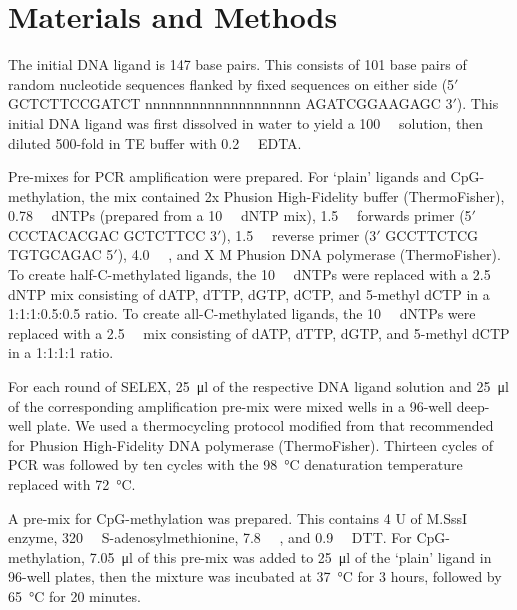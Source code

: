 \documentclass[parskip=full, numbers=noenddot]{scrreprt}
\begin{document}

\section{Materials and Methods}
\label{sec:emsaselex_methods}

The initial DNA ligand is 147 base pairs. This consists of 101 base pairs of random nucleotide sequences flanked by fixed sequences on either side (5$'$ GCTCTTCCGATCT nnnnnnnnnnnnnnnnnnnn AGATCGGAAGAGC 3$'$). This initial DNA ligand was first dissolved in water to yield a \SI{100}{\micro\Molar} solution, then diluted 500-fold in TE buffer with \SI{0.2}{\milli\Molar} EDTA.

Pre-mixes for PCR amplification were prepared. For `plain' ligands and CpG-methylation, the mix contained 2x Phusion High-Fidelity buffer (ThermoFisher), \SI{0.78}{\milli\Molar} dNTPs (prepared from a \SI{10}{\milli\Molar} dNTP mix), \SI{1.5}{\micro\Molar} forwards primer (5$'$ CCCTACACGAC GCTCTTCC 3$'$), \SI{1.5}{\micro\Molar} reverse primer (3$'$ GCCTTCTCG TGTGCAGAC 5$'$), \SI{4.0}{\micro\Molar} , and X M Phusion DNA polymerase (ThermoFisher). To create half-C-methylated ligands, the \SI{10}{\milli\Molar} dNTPs were replaced with a \SI{2.5}{\milli\Molar} dNTP mix consisting of dATP, dTTP, dGTP, dCTP, and 5-methyl dCTP in a 1:1:1:0.5:0.5 ratio. To create all-C-methylated ligands, the \SI{10}{\milli\Molar} dNTPs were replaced with a \SI{2.5}{\milli\Molar} mix consisting of dATP, dTTP, dGTP, and 5-methyl dCTP in a 1:1:1:1 ratio.


For each round of SELEX, \SI{25}{\micro\litre} of the respective DNA ligand solution and \SI{25}{\micro\litre} of the corresponding amplification pre-mix were mixed wells in a 96-well deep-well plate. We used a thermocycling protocol modified from that recommended for Phusion High-Fidelity DNA polymerase (ThermoFisher). Thirteen cycles of PCR was followed by ten cycles with the \SI{98}{\celsius} denaturation temperature replaced with \SI{72}{\celsius}.

A pre-mix for CpG-methylation was prepared. This contains 4 U of M.SssI enzyme, \SI{320}{\micro\Molar} S-adenosylmethionine, \SI{7.8}{\milli\Molar} ,
and \SI{0.9}{\milli\Molar} DTT. For CpG-methylation, \SI{7.05}{\micro\litre} of this pre-mix was added to \SI{25}{\micro\litre} of the `plain' ligand in 96-well plates, then the mixture was incubated at \SI{37}{\celsius} for 3 hours, followed by \SI{65}{\celsius} for 20 minutes.
\end{document}
